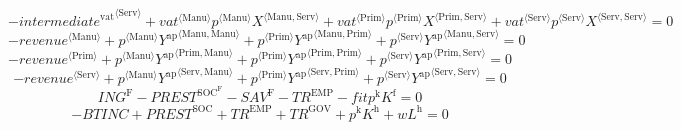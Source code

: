 \begin{equation}
-{{i\!n\!t\!e\!r\!m\!e\!d\!i\!a\!t\!e}^{\mathrm{vat}}}^{\langle \mathrm{Serv}\rangle} + {{{v\!a\!t}}^{\langle \mathrm{\mathrm{Manu}}\rangle}} {{p}^{\langle \mathrm{Manu}\rangle}} {{X}^{\langle \mathrm{Manu},\mathrm{Serv}\rangle}} + {{{v\!a\!t}}^{\langle \mathrm{\mathrm{Prim}}\rangle}} {{p}^{\langle \mathrm{Prim}\rangle}} {{X}^{\langle \mathrm{Prim},\mathrm{Serv}\rangle}} + {{{v\!a\!t}}^{\langle \mathrm{\mathrm{Serv}}\rangle}} {{p}^{\langle \mathrm{Serv}\rangle}} {{X}^{\langle \mathrm{Serv},\mathrm{Serv}\rangle}} = 0
\end{equation}
\begin{equation}
-{{r\!e\!v\!e\!n\!u\!e}}^{\langle \mathrm{Manu}\rangle} + {{p}^{\langle \mathrm{Manu}\rangle}} {{Y^{\mathrm{ap}}}^{\langle \mathrm{Manu},\mathrm{Manu}\rangle}} + {{p}^{\langle \mathrm{Prim}\rangle}} {{Y^{\mathrm{ap}}}^{\langle \mathrm{Manu},\mathrm{Prim}\rangle}} + {{p}^{\langle \mathrm{Serv}\rangle}} {{Y^{\mathrm{ap}}}^{\langle \mathrm{Manu},\mathrm{Serv}\rangle}} = 0
\end{equation}
\begin{equation}
-{{r\!e\!v\!e\!n\!u\!e}}^{\langle \mathrm{Prim}\rangle} + {{p}^{\langle \mathrm{Manu}\rangle}} {{Y^{\mathrm{ap}}}^{\langle \mathrm{Prim},\mathrm{Manu}\rangle}} + {{p}^{\langle \mathrm{Prim}\rangle}} {{Y^{\mathrm{ap}}}^{\langle \mathrm{Prim},\mathrm{Prim}\rangle}} + {{p}^{\langle \mathrm{Serv}\rangle}} {{Y^{\mathrm{ap}}}^{\langle \mathrm{Prim},\mathrm{Serv}\rangle}} = 0
\end{equation}
\begin{equation}
-{{r\!e\!v\!e\!n\!u\!e}}^{\langle \mathrm{Serv}\rangle} + {{p}^{\langle \mathrm{Manu}\rangle}} {{Y^{\mathrm{ap}}}^{\langle \mathrm{Serv},\mathrm{Manu}\rangle}} + {{p}^{\langle \mathrm{Prim}\rangle}} {{Y^{\mathrm{ap}}}^{\langle \mathrm{Serv},\mathrm{Prim}\rangle}} + {{p}^{\langle \mathrm{Serv}\rangle}} {{Y^{\mathrm{ap}}}^{\langle \mathrm{Serv},\mathrm{Serv}\rangle}} = 0
\end{equation}
\begin{equation}
{I\!N\!G}^{\mathrm{F}} - {P\!R\!E\!S\!T}^{\mathrm{SOC}^{\mathrm{F}}} - {S\!A\!V}^{\mathrm{F}} - {T\!R}^{\mathrm{EMP}} - {{f\!i\!t}} {p^{\mathrm{k}}} {K^{\mathrm{f}}} = 0
\end{equation}
\begin{equation}
-{B\!T\!I\!N\!C} + {P\!R\!E\!S\!T}^{\mathrm{SOC}} + {T\!R}^{\mathrm{EMP}} + {T\!R}^{\mathrm{GOV}} + {p^{\mathrm{k}}} {K^{\mathrm{h}}} + {w} {L^{\mathrm{h}}} = 0
\end{equation}

